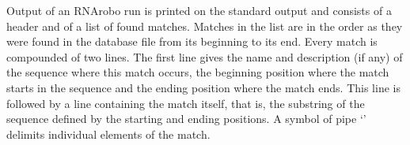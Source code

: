 \documentclass[11pt]{article}
\begin{document}
Output of an RNArobo run is printed on the standard output and consists of a header and of a list of found matches. Matches in the list are in the order as they were found in the database file from its beginning to its end. Every match is compounded of two lines. The first line gives the name and description (if any) of the sequence where this match occurs, the beginning position where the match starts in the sequence and the ending position where the match ends. This line is followed by a line containing the match itself, that is, the substring of the sequence defined by the starting and ending positions. A symbol of pipe `\textbar' delimits individual elements of the match.


 
\end{document}
